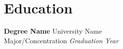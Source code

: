 \documentclass[11pt,a4paper]{article}
\newcommand{\education}[4]{
    \textbf{#1} \hfill #2 \\
    #3 \hfill \textit{#4}
    \vspace{-4pt}
}
\begin{document}
\section{Education}

\education{Degree Name}{University Name}{Major/Concentration}{Graduation Year}


\end{document}
